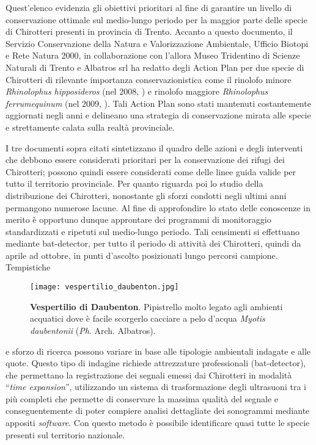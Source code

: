 \documentclass[10pt,twoside,openany,x11names,svgnames,italian,a5paper,dvipsnames,table]{memoir}
\newcommand{\ph}{\emph{Ph}. }
\begin{document}
Quest’elenco evidenzia gli obiettivi prioritari al fine di garantire un livello di conservazione ottimale sul medio-lungo periodo per la maggior parte delle specie di Chirotteri presenti in provincia di Trento.
Accanto a questo documento, il Servizio Conservazione della Natura e Valorizzazione Ambientale, Ufficio Biotopi e Rete Natura 2000, in collaborazione con l’allora Museo Tridentino di Scienze Naturali di Trento e Albatros srl ha redatto degli Action Plan per due specie di Chirotteri di rilevante importanza conservazionistica come il rinolofo minore \emph{Rhinolophus hipposideros} (nel 2008, \cite{Torboli08}) e rinolofo maggiore \emph{Rhinolophus ferrumequinum} (nel 2009, \cite{Torboli09}). Tali Action Plan sono stati mantenuti costantemente aggiornati negli anni e delineano una strategia di conservazione mirata alle specie e strettamente calata sulla realtà provinciale.

I tre documenti sopra citati sintetizzano il quadro delle azioni e degli interventi che debbono essere considerati prioritari per la conservazione dei rifugi dei Chirotteri; possono quindi essere considerati come delle linee guida valide per tutto il territorio provinciale.
Per quanto riguarda poi lo studio della distribuzione dei Chirotteri, nonostante gli sforzi condotti negli ultimi anni permangono numerose lacune. Al fine di approfondire lo stato delle conoscenze in merito è opportuno dunque approntare dei programmi di monitoraggio standardizzati e ripetuti sul medio-lungo periodo. Tali censimenti si effettuano mediante bat-detector, per tutto il periodo di attività dei Chirotteri, quindi da aprile ad ottobre, in punti d’ascolto posizionati lungo percorsi campione. Tempistiche
\begin{wrapfigure}[16]{r}{.6\columnwidth}
\centering
\vspace{-.4cm}
  \texttt{[image: vespertilio\_daubenton.jpg]}
  \caption*{\textbf{Vespertilio di Daubenton}. Pipistrello molto legato agli ambienti acquatici dove è facile scorgerlo cacciare a pelo d’acqua \emph{Myotis daubentonii} (\ph Arch. Albatros).}
\end{wrapfigure}
e sforzo di ricerca possono variare in base alle tipologie ambientali indagate e alle quote. Questo tipo di indagine richiede attrezzature professionali (bat-detector), che permettano la registrazione dei segnali emessi dai Chirotteri in modalità “\emph{time expansion}”, utilizzando un sistema di trasformazione degli ultrasuoni tra i più completi che permette di conservare la massima qualità del segnale e conseguentemente di poter compiere analisi dettagliate dei sonogrammi mediante appositi \emph{software}. Con questo metodo è possibile identificare quasi tutte le specie presenti sul territorio nazionale.
\end{document}
